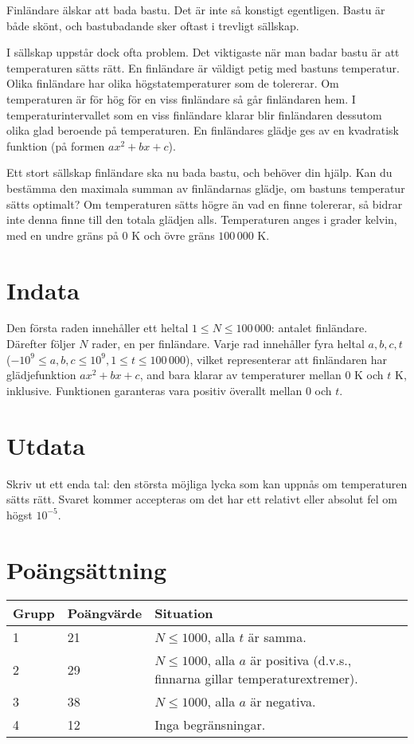 Finländare älskar att bada bastu. Det är inte så konstigt egentligen.
Bastu är både skönt, och bastubadande sker oftast i trevligt sällskap.

I sällskap uppstår dock ofta problem. Det viktigaste när man badar bastu är att temperaturen sätts rätt.
En finländare är väldigt petig med bastuns temperatur.
Olika finländare har olika högstatemperaturer som de tolererar.
Om temperaturen är för hög för en viss finländare så går finländaren hem.
I temperaturintervallet som en viss finländare klarar blir finländaren dessutom olika glad beroende på temperaturen.
En finländares glädje ges av en kvadratisk funktion (på formen $ax^2 + bx + c$).

Ett stort sällskap finländare ska nu bada bastu, och behöver din hjälp.
Kan du bestämma den maximala summan av finländarnas glädje, om bastuns temperatur sätts optimalt?
Om temperaturen sätts högre än vad en finne tolererar, så bidrar inte denna finne till den totala glädjen alls.
Temperaturen anges i grader kelvin, med en undre gräns på $0 \textrm{ K}$ och övre gräns $100\,000 \textrm{ K}$.

\section*{Indata}
Den första raden innehåller ett heltal $1 \le N \le 100\,000$: antalet finländare.
Därefter följer $N$ rader, en per finländare.
Varje rad innehåller fyra heltal $a, b, c, t$ ($-10^9 \le a,b,c \le 10^9, 1 \le t \le 100\,000$), vilket representerar att finländaren har glädjefunktion $ax^2 + bx + c$, and bara klarar av temperaturer mellan $0\textrm{ K}$ och $t\textrm{ K}$, inklusive.
Funktionen garanteras vara positiv överallt mellan $0$ och $t$.

\section*{Utdata}
Skriv ut ett enda tal: den största möjliga lycka som kan uppnås om temperaturen sätts rätt.
Svaret kommer accepteras om det har ett relativt eller absolut fel om högst $10^{-5}$.


\section*{Poängsättning}
\begin{tabular}{| l | l | l |}
\hline
Grupp & Poängvärde & Situation \\ \hline
1     & 21         & $N \le 1000$, alla $t$ är samma. \\ \hline
2     & 29         & $N \le 1000$, alla $a$ är positiva (d.v.s., finnarna gillar temperaturextremer). \\ \hline
3     & 38         & $N \le 1000$, alla $a$ är negativa. \\ \hline
4     & 12         & Inga begränsningar. \\ \hline
\end{tabular}
